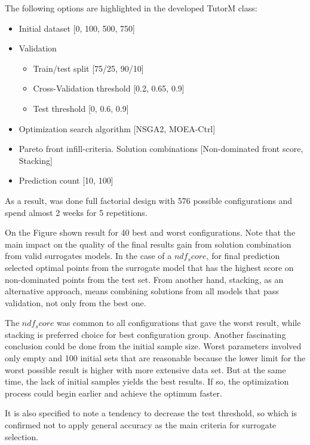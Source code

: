     The following options are highlighted in the developed TutorM class:
    \begin{itemize}
        \item Initial dataset [0, 100, 500, 750]
        \item Validation
            \begin{itemize}
                \item Train/test split [75/25, 90/10]
                \item Cross-Validation threshold [0.2, 0.65, 0.9]
                \item Test threshold [0, 0.6, 0.9]
            \end{itemize}
        \item Optimization search algorithm [NSGA2, MOEA-Ctrl]
        \item Pareto front infill-criteria. Solution combinations [Non-dominated front score, Stacking]
        \item Prediction count [10, 100]
    \end{itemize}

    As a result, was done full factorial design with 576 possible configurations and spend almost 2 weeks for 5 repetitions.

    On the Figure shown result for 40 best and worst configurations. Note that the main impact on the quality of the final results gain from solution combination from valid surrogates models. In the case of a $ndf_score$, for final prediction selected optimal points from the surrogate model that has the highest score on non-dominated points from the test set. From another hand, stacking, as an alternative approach, means combining solutions from all models that pass validation, not only from the best one.

    The $ndf_score$  was common to all configurations that gave the worst result, while stacking is preferred choice for best configuration group. Another fascinating conclusion could be done from the initial sample size. Worst parameters involved only empty and 100 initial sets that are reasonable because the lower limit for the worst possible result is higher with more extensive data set. But at the same time, the lack of initial samples yields the best results. If so, the optimization process could begin earlier and achieve the optimum faster. 

    It is also specified to note a tendency to decrease the test threshold, so which is confirmed not to apply general accuracy as the main criteria for surrogate selection.

